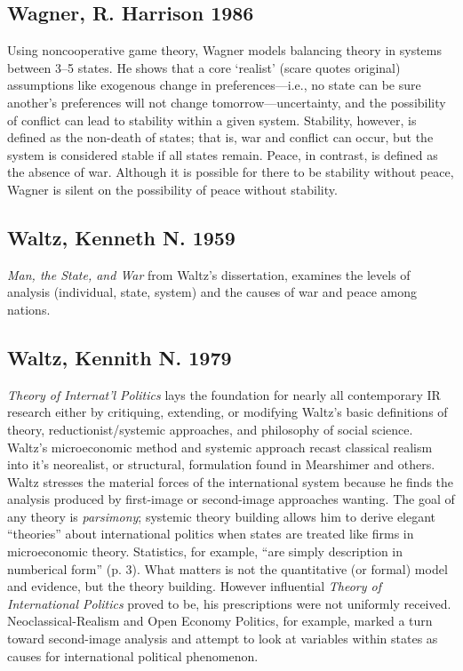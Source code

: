 \documentclass[11pt]{article}
\begin{document}
\subsection{Wagner, R. Harrison 1986}
\label{sec-2-7}
Using noncooperative game theory, Wagner models balancing theory in
systems between 3--5 states. He shows that a core `realist' (scare
quotes original) assumptions like exogenous change in
preferences---i.e., no state can be sure another's preferences will
not change tomorrow---uncertainty, and the possibility of conflict can
lead to stability within a given system. Stability, however, is
defined as the non-death of states; that is, war and conflict can
occur, but the system is considered stable if all states
remain. Peace, in contrast, is defined as the absence of war. Although
it is possible for there to be stability without peace, Wagner is
silent on the possibility of peace without stability. 
\subsection{Waltz, Kenneth N. 1959}
\label{sec-2-8}
\emph{Man, the State, and War} from Waltz's dissertation, examines the
levels of analysis (individual, state, system) and the causes of war
and peace among nations. 
\subsection{Waltz, Kennith N. 1979}
\label{sec-2-9}
\emph{Theory of Internat'l Politics} lays the foundation for nearly
all contemporary IR research either by critiquing, extending, or
modifying Waltz's basic definitions of theory, reductionist/systemic
approaches, and philosophy of social science. Waltz's microeconomic
method and systemic approach recast classical realism into it's
neorealist, or structural, formulation found in Mearshimer and
others. Waltz stresses the material forces of the international system
because he finds the analysis produced by first-image or second-image
approaches wanting. The goal of any theory is \emph{parsimony}; systemic
theory building allows him to derive elegant ``theories'' about
international politics when states are treated like firms in
microeconomic theory. Statistics, for example, ``are simply description
in numberical form'' (p. 3). What matters is not the quantitative (or
formal) model and evidence, but the theory building. However
influential \emph{Theory of International Politics} proved to be, his
prescriptions were not uniformly received. Neoclassical-Realism and
Open Economy Politics, for example, marked a turn toward second-image
analysis and attempt to look at variables within states as causes for
international political phenomenon. 
\end{document}
